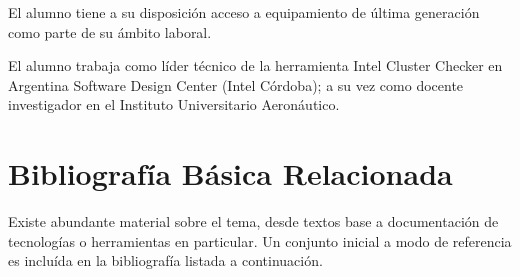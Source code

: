 \documentclass[a4paper]{article}
\begin{document}
El alumno tiene a su disposici\'on acceso a equipamiento de \'ultima
generaci\'on como parte de su \'ambito laboral.

El alumno trabaja como l\'ider t\'ecnico de la herramienta Intel Cluster
Checker en Argentina Software Design Center (Intel C\'ordoba); a su vez
como docente investigador en el Instituto Universitario Aeron\'autico.

\section{Bibliograf\'ia B\'asica Relacionada}

Existe abundante material sobre el tema, desde textos base a documentaci\'on
de tecnolog\'ias o herramientas en particular. Un conjunto inicial a modo de
referencia es inclu\'ida en la bibliograf\'ia listada a continuaci\'on.
\end{document}
